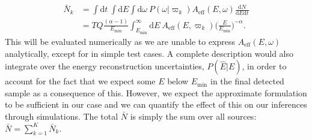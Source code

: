 \documentclass[fontsize=12pt]{article}
\begin{document}
\begin{equation}
\begin{split}
\bar{N}_k & = \int \mathrm{d}t \ \int \mathrm{d}E \int \mathrm{d}\omega \ P(\omega | \varpi_k) A_\mathrm{eff}(E, \omega)\frac{\mathrm{d}N}{\mathrm{d}E\mathrm{d}t} \\
& = TQ \frac{(\alpha -1)}{E_\mathrm{min}} \int_{E _\mathrm{min}}^{\infty} \mathrm{d}E \ A_\mathrm{eff}(E, \varpi_k) \Bigg( \frac{E}{E_\mathrm{min}} \Bigg)^{-\alpha}.
\end{split}
\end{equation}
This will be evaluated numerically as we are unable to express $A_\mathrm{eff}(E, \omega)$ analytically, except for in simple test cases. A complete description would also integrate over the energy reconstruction uncertainties, $P(\hat{E} | E)$, in order to account for the fact that we expect some $E$ below $E_\mathrm{min}$ in the final detected sample as a consequence of this. However, we expect the approximate formulation to be sufficient in our case and we can quantify the effect of this on our inferences through simulations. The total $\bar{N}$ is simply the sum over all sources: $\bar{N} = \sum_{k=1}^K \bar{N}_k$.



\end{document}
